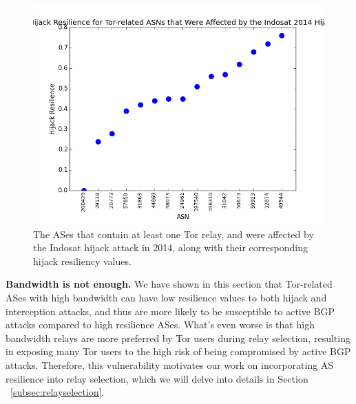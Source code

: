 \begin{figure}
\centering
\includegraphics[width=.4\textwidth]{case_study_graph}
\caption{The ASes that contain at least one Tor relay, and were affected by the Indosat hijack attack in 2014, along with their corresponding hijack resiliency values.}
\label{fig:case_study}
\end{figure}

{\bf Bandwidth is not enough.} We have shown in this section that Tor-related ASes with high bandwidth can have low resilience values to both hijack and interception attacks, and thus are more likely to be susceptible to active BGP attacks compared to high resilience ASes. What's even worse is that high bandwidth relays are more preferred by Tor users during relay selection, resulting in exposing many Tor users to the high risk of being compromised by active BGP attacks. Therefore, this vulnerability motivates our work on incorporating AS resilience into relay selection, which we will delve into details in Section ~\ref{subsec:relayselection}.



